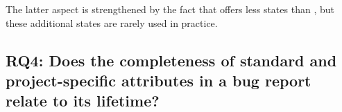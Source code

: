 The latter aspect is strengthened by the fact that \jira offers less states than \bzilla, but these additional states are rarely used in practice.



%
%

\subsection*{RQ4: Does the completeness of standard and project-specific attributes in a bug report relate to its lifetime?}\label{sec:model-fields}


